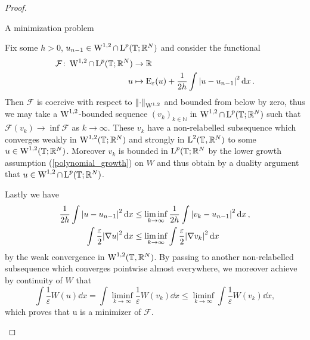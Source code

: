 \begin{proof}
	\begin{description}[wide=0pt]
		\item[Step 1:] A minimization problem
		
		Fix some $ h > 0 $, $ u_{ n - 1 } \in \operatorname{W}^{1 , 2 }\cap \operatorname{L}^{ p } ( \operatorname{\mathbb{T}}; \mathbb{ R }^{ N } ) $ and consider the functional
		\begin{align}
			\label{de_giorgi_min_functional}
			\mathcal{ F } \colon \operatorname{W}^{ 1, 2 } \cap \operatorname{L}^{ p } ( \operatorname{\mathbb{T}} ; \mathbb{ R }^{ N } )
			& \to
			\mathbb{ R }
			\\
			u & \mapsto 
			\operatorname{E}_{ \varepsilon } ( u ) + 
			\frac{ 1 }{ 2h } \int \abs{ u - u_{ n - 1 } }^{ 2 } \dd{x }
			\notag .
		\end{align}
		Then $ \mathcal{ F } $ is coercive with respect to 
		$ \norm{ \cdot }_{ \operatorname{W}^{ 1, 2 } } $ 
		and bounded from below by zero, thus we may take a $ \operatorname{W}^{ 1 , 2 } $-bounded sequence  
		$ (v_{ k } )_{ k \in \mathbb{ N } } $ in $ \operatorname{W}^{ 1 , 2} \cap \operatorname{L}^{ p } ( \operatorname{\mathbb{T}} ; \mathbb{ R }^{ N } ) $ such that 
		$ \mathcal{ F } ( v_{ k } ) \to \inf \mathcal{ F } $ as $ k \to \infty $. 
		These $ v_{ k } $ have a non-relabelled subsequence which converges weakly in $ \operatorname{W}^{ 1 , 2 } ( \operatorname{\mathbb{T}} ; \mathbb{ R }^{ N } ) $ and strongly in $ \operatorname{L}^{ 2 } ( \operatorname{\mathbb{T}}, \mathbb{ R }^{ N } ) $ to some $ u \in \operatorname{W}^{ 1, 2 } ( \operatorname{\mathbb{T}}; \mathbb{ R }^{ N } ) $.
		Moreover $ v_{ k } $ is bounded in $ \operatorname{L}^{ p } ( \operatorname{\mathbb{T}} ; \mathbb{ R }^{ N } $ by the lower growth assumption (\ref{polynomial_growth}) on $ W $
		and thus obtain by a duality argument that $ u \in \operatorname{W}^{ 1 , 2 } \cap \operatorname{L}^{ p } ( \operatorname{\mathbb{T}} ; \mathbb{ R }^{ N } ) $.
		
		Lastly we have 
		\begin{align}
			\frac{ 1 }{ 2 h }
			\int \abs{ u - u_{ n - 1 } }^{ 2 } \dd{ x}
			& \leq
			\liminf_{ k \to \infty }
			\frac{ 1 }{ 2h }
			\int \abs{ v_{ k } - u_{ n -1 } }^{ 2 } \dd{ x },
			\\
			\int \frac{ \varepsilon }{ 2 } \abs{ \nabla u }^{ 2 } \dd{ x }
			& \leq
			\liminf_{ k \to \infty }
				\int \frac{ \varepsilon }{ 2 } \abs{ \nabla v_{ k } }^{ 2 } \dd{ x }
		\end{align}
	by the weak convergence in $ \operatorname{W}^{ 1 , 2 } ( \operatorname{\mathbb{T}} , \mathbb{ R }^{ N } )$.
	By passing to another non-relabelled subsequence which converges pointwise almost everywhere, we moreover achieve by continuity of $ W $ that
	\begin{equation*}
		\int \frac{ 1 }{ \varepsilon } W ( u ) \dd{ x }
		=
		\int \liminf_{ k \to \infty } \frac{ 1 }{ \varepsilon } W ( v_{k } ) \dd{ x }
		\leq
		\liminf_{ k \to \infty } \int \frac{ 1 }{ \varepsilon } W ( v_{ k } ) \dd{x},
	\end{equation*}
	which proves that u is a minimizer of $ \mathcal{ F } $.
	

\end{description}
\end{proof}
